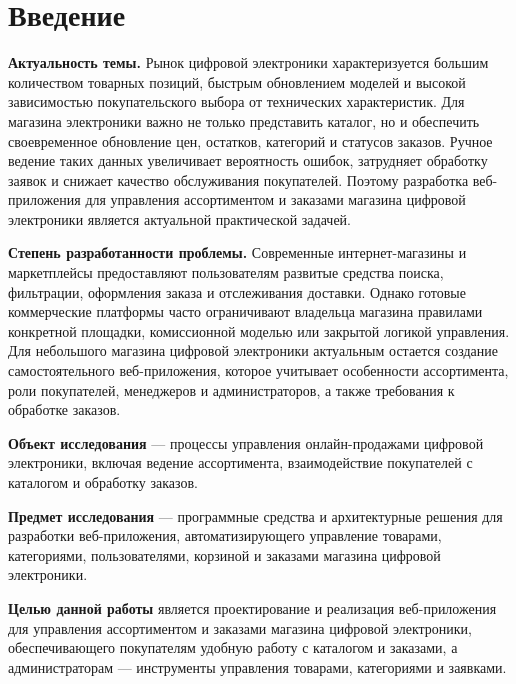 \section*{Введение}

\textbf{Актуальность темы.} Рынок цифровой электроники характеризуется большим количеством
товарных позиций, быстрым обновлением моделей и высокой зависимостью покупательского выбора
от технических характеристик. Для магазина электроники важно не только представить каталог,
но и обеспечить своевременное обновление цен, остатков, категорий и статусов заказов.
Ручное ведение таких данных увеличивает вероятность ошибок, затрудняет обработку заявок и
снижает качество обслуживания покупателей. Поэтому разработка веб-приложения для управления
ассортиментом и заказами магазина цифровой электроники является актуальной практической задачей.

\textbf{Степень разработанности проблемы.} Современные интернет-магазины и маркетплейсы
предоставляют пользователям развитые средства поиска, фильтрации, оформления заказа и
отслеживания доставки. Однако готовые коммерческие платформы часто ограничивают владельца
магазина правилами конкретной площадки, комиссионной моделью или закрытой логикой управления.
Для небольшого магазина цифровой электроники актуальным остается создание самостоятельного
веб-приложения, которое учитывает особенности ассортимента, роли покупателей, менеджеров и
администраторов, а также требования к обработке заказов.

\textbf{Объект исследования} --- процессы управления онлайн-продажами цифровой электроники,
включая ведение ассортимента, взаимодействие покупателей с каталогом и обработку заказов.

\textbf{Предмет исследования} --- программные средства и архитектурные решения для разработки
веб-приложения, автоматизирующего управление товарами, категориями, пользователями, корзиной
и заказами магазина цифровой электроники.

\textbf{Целью данной работы} является проектирование и реализация веб-приложения для управления
ассортиментом и заказами магазина цифровой электроники, обеспечивающего покупателям удобную
работу с каталогом и заказами, а администраторам --- инструменты управления товарами,
категориями и заявками.
